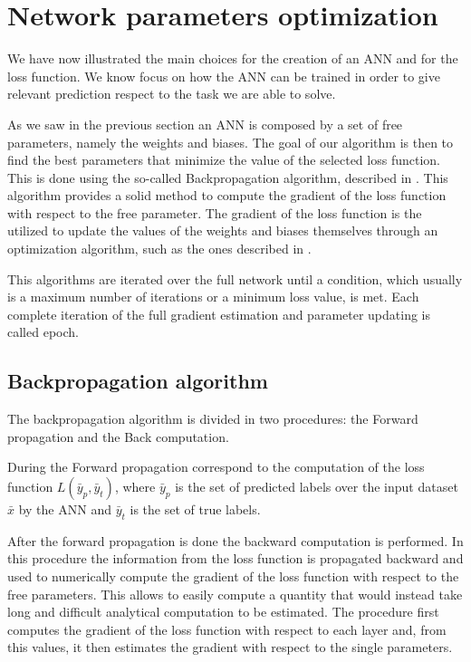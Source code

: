 \section{Network parameters optimization}\label{weightoptimization}

We have now illustrated the main choices for the creation of an ANN and for the loss function. We know focus on how the ANN can be trained in order to give relevant prediction respect to the task we are able to solve. 

As we saw in the previous section an ANN is composed by a set of free parameters, namely the weights and biases. The goal of our algorithm is then to find the best parameters that minimize the value of the selected loss function. This is done using the so-called Backpropagation algorithm, described in . This algorithm provides a solid method to compute the gradient of the loss function with respect to the free parameter. The gradient of the loss function is the utilized to update the values of the weights and biases themselves through an optimization algorithm, such as the ones described in .

This algorithms are iterated over the full network until a condition, which usually is a maximum number of iterations or a minimum loss value, is met. Each complete iteration of the full gradient estimation and parameter updating is called epoch.

\subsection{Backpropagation algorithm}\label{backprop}

The backpropagation algorithm is divided in two procedures: the Forward propagation and the Back computation.

During the Forward propagation correspond to the computation of the loss function $L(\bar{y}_p, \bar{y}_t)$, where $\bar{y}_p$ is the set of predicted labels over the input dataset $\bar{x}$ by the ANN and $\bar{y}_t$ is the set of true labels. 

After the forward propagation is done the backward computation is performed. In this procedure the information from the loss function is propagated backward and used to numerically compute the gradient of the loss function with respect to the free parameters. This allows to easily compute a quantity that would instead take long and difficult analytical computation to be estimated.
The procedure first computes the gradient of the loss function with respect to each layer and, from this values, it then estimates the gradient with respect to the single parameters.

